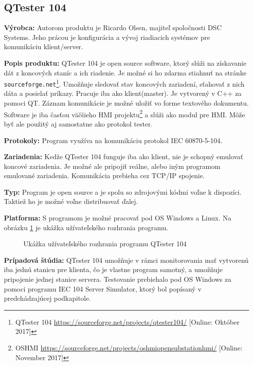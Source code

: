 \subsection{QTester 104}
\textbf{Výrobca:} Autorom produktu je Ricardo Olsen, majiteľ spoločnosti DSC Systems. Jeho prácou je konfigurácia a vývoj riadiacich systémov pre komunikáciu klient/server. \par
\noindent \textbf{Popis produktu:} QTester 104 je open source software, ktorý slúži na získavanie dát z koncových staníc a ich riadenie. Je možné si ho zdarma stiahnuť na stránke {\tt sourceforge.net}\footnote{QTester 104 \url{https://sourceforge.net/projects/qtester104/} [Online: Október 2017]}. Umožňuje sledovať stav koncových zariadení, sťahovať z nich dáta a posielať príkazy. Pracuje iba ako klient(master). Je vytvorený v C++ za pomoci QT. Záznam komunikácie je možné uložiť vo forme textového dokumentu. Software je iba časťou väčšieho HMI projektu\footnote{OSHMI \url{https://sourceforge.net/projects/oshmiopensubstationhmi/} [Online: November 2017]} a slúži ako modul pre HMI. Môže byť ale použitý aj samostatne ako protokol tester. \par
\noindent \textbf{Protokoly:} Program využíva na komunikáciu protokol IEC 60870-5-104. \par
\noindent \textbf{Zariadenia:} Kedže QTester 104 funguje iba ako klient, nie je schopný emulovať koncové zariadenia. Je možné ale pripojiť reálne, alebo iným programom emulované zariadenia. Komunikácia prebieha cez TCP/IP spojenie. \par
\noindent \textbf{Typ:} Program je open source a je spolu so zdrojovými kódmi voľne k dispozíci. Taktiež ho je možné voľne distribuovať ďalej. \par
\noindent \textbf{Platforma:} S programom je možné pracovať pod OS Windows a Linux. Na obrázku \ref{QTester} je ukážka užívateľského rozhrania programu. \par
\begin{figure}[h]
	\centering
    \caption{Ukážka užívateľského rozhrania programu QTester 104}
\label{QTester}
\end{figure}
\noindent \textbf{Prípadová štúdia:} QTester 104 umožňuje v rámci monitorovania mať vytvorenú iba jednú stanicu pre klienta, čo je vlastne program samotný, a umožňuje pripojenie jednej stanice servera. Testovanie prebiehalo pod OS Windows za pomoci programu IEC 104 Server Simulator, ktorý bol popísaný v predchádzajúcej podkapitole. \par
